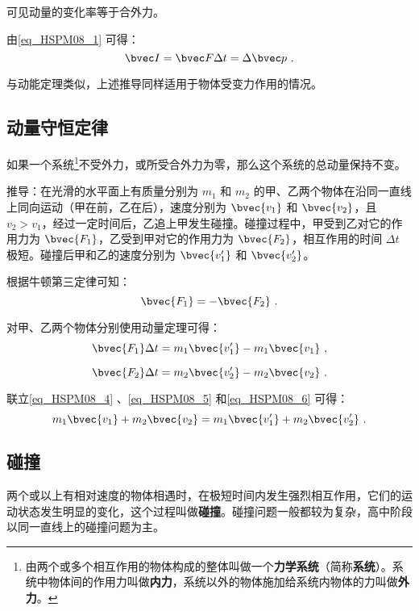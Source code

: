 可见动量的变化率等于合外力。

由\autoref{eq_HSPM08_1} 可得：
\begin{equation}\label{eq_HSPM08_3}
\bvec I=\bvec F\Delta t=\Delta \bvec p~.
\end{equation}

与动能定理类似，上述推导同样适用于物体受变力作用的情况。

\subsection{动量守恒定律}

如果一个系统\footnote{由两个或多个相互作用的物体构成的整体叫做一个\textbf{力学系统}（简称\textbf{系统}）。系统中物体间的作用力叫做\textbf{内力}，系统以外的物体施加给系统内物体的力叫做\textbf{外力}。}不受外力，或所受合外力为零，那么这个系统的总动量保持不变。

推导：在光滑的水平面上有质量分别为 $m_1$ 和 $m_2$ 的甲、乙两个物体在沿同一直线上同向运动（甲在前，乙在后），速度分别为 $\bvec{v_1}$ 和 $\bvec{v_2}$，且 $v_2>v_1$，经过一定时间后，乙追上甲发生碰撞。碰撞过程中，甲受到乙对它的作用力为 $\bvec {F_1}$，乙受到甲对它的作用力为 $\bvec {F_2}$，相互作用的时间 $\Delta t$ 极短。碰撞后甲和乙的速度分别为 $\bvec{v_1'}$ 和 $\bvec{v_2'}$。

根据牛顿第三定律可知：
\begin{equation}\label{eq_HSPM08_4}
\bvec {F_1}=-\bvec{F_2}~.
\end{equation}

对甲、乙两个物体分别使用动量定理可得：
\begin{equation}\label{eq_HSPM08_5}
\bvec{F_1}\Delta t=m_1\bvec{v_1'}-m_1\bvec{v_1}~,
\end{equation}

\begin{equation}\label{eq_HSPM08_6}
\bvec{F_2}\Delta t=m_2\bvec{v_2'}-m_2\bvec{v_2}~.
\end{equation}

联立\autoref{eq_HSPM08_4} 、\autoref{eq_HSPM08_5} 和\autoref{eq_HSPM08_6} 可得：
\begin{equation}
m_1\bvec{v_1}+ m_2\bvec{v_2}= m_1\bvec{v_1'}+ m_2\bvec{v_2'}~.
\end{equation}


\subsection{碰撞}

两个或以上有相对速度的物体相遇时，在极短时间内发生强烈相互作用，它们的运动状态发生明显的变化，这个过程叫做\textbf{碰撞}。碰撞问题一般都较为复杂，高中阶段以同一直线上的碰撞问题为主。

